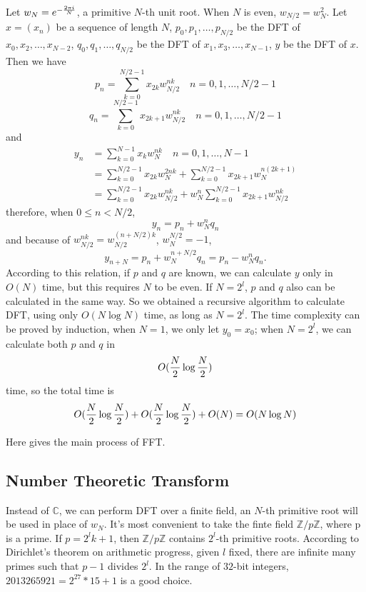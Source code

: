 Let $w_N = e^{-{2\pi i \over N}}$, a primitive $N$-th unit root.
When $N$ is even, $w_{N / 2} = w_N^2$.
Let $x=(x_n)$ be a sequence of length $N$, 
$p_0, p_1, \dots, p_{N/2}$ be the DFT of $x_0, x_2, \dots, x_{N-2}$,
$q_0, q_1, \dots, q_{N/2}$ be the DFT of $x_1, x_3, \dots, x_{N-1}$,
$y$ be the DFT of $x$.
Then we have
$$p_n = \sum_{k=0}^{N/2 - 1} x_{2k} w_{N/2}^{nk} \quad n = 0, 1, \dots, N/2 - 1$$
$$q_n = \sum_{k=0}^{N/2 - 1} x_{2k+1} w_{N/2}^{nk} \quad n = 0, 1, \dots, N/2 - 1$$
and 
\begin{align*}
y_n &= \sum_{k=0}^{N-1} x_k w_N^{nk} \quad n = 0, 1, \dots, N - 1\\
&= \sum_{k=0}^{N/2-1} x_{2k} w_N^{2nk} + \sum_{k=0}^{N/2 - 1} x_{2k+1} w_N^{n(2k+1)} \\
&= \sum_{k=0}^{N/2-1} x_{2k} w_{N/2}^{nk} + w_N^n \sum_{k=0}^{N/2 - 1} x_{2k+1} w_{N/2}^{nk}
\end{align*}
therefore, when $0 \leq n < N / 2$, 
$$y_n = p_n + w_N^n q_n$$
and because of $w_{N/2}^{nk} = w_{N/2}^{(n+N/2)k}$, $w_N^{N/2} = -1$,
$$y_{n + N} = p_n + w_N^{n + N/2} q_n = p_n - w_N^n q_n.$$
According to this relation, 
if $p$ and $q$ are known, we can calculate $y$ only in $O(N)$ time,
but this requires $N$ to be even. If $N=2^l$, $p$ and $q$ also can be calculated
in the same way. So we obtained a recursive algorithm to calculate DFT, 
using only $O(N\log N)$ time, as long as $N = 2^l$.
The time complexity can be proved by induction,
when $N = 1$, we only let $y_0 = x_0$;
when $N = 2^l$, we can calculate both $p$ and $q$ in 
$$O({N\over 2}\log {N\over 2})$$ time,
so the total time is 
$$O({N\over 2}\log {N\over 2}) + O({N\over 2}\log {N\over 2}) + O(N) = O(N\log N)$$

Here gives the main process of FFT.


\subsection{Number Theoretic Transform}
Instead of $\mathbb{C}$, we can perform DFT over a finite field, 
an $N$-th primitive root will be used in place of $w_N$.
It's most convenient to take the finte field $\mathbb{Z} / p\mathbb{Z}$, 
where p is a prime.
If $p=2^lk + 1$, then $\mathbb{Z} / p\mathbb{Z}$ contains
$2^l$-th primitive roots. According to Dirichlet's theorem on arithmetic progress,
given $l$ fixed, there are infinite many primes such that $p-1$ divides $2^l$.
In the range of $32$-bit integers, $2013265921 = 2^{27} \ast 15 + 1$ is a good choice.
